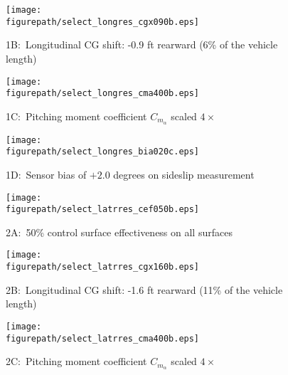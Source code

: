 \documentclass[]{../sty/aiaa-tc}
\newcommand{\figurepath}{../fig}
\begin{document}
  \begin{figure}[H]
    \begin{center}
      \texttt{[image: \\figurepath/select\_longres\_cgx090b.eps]}
      \caption{1B:\ Longitudinal CG shift: -0.9 ft rearward (6\% of the vehicle length)}
    \end{center}
  \end{figure}

  \begin{figure}[H]
    \begin{center}
      \texttt{[image: \\figurepath/select\_longres\_cma400b.eps]}
      \caption{1C:\ Pitching moment coefficient $C_{m_{\alpha}}$ scaled $4\times$}
    \end{center}
  \end{figure}

  \begin{figure}[H]
    \begin{center}
      \texttt{[image: \\figurepath/select\_longres\_bia020c.eps]}
      \caption{1D:\ Sensor bias of $+2.0$ degrees on sideslip measurement}
      \vspace{-0.2in}
    \end{center}
  \end{figure}

  \begin{figure}[H]
    \begin{center}
      \texttt{[image: \\figurepath/select\_latrres\_cef050b.eps]}
      \caption{2A:\ 50\% control surface effectiveness on all surfaces}
    \end{center}
  \end{figure}

  \begin{figure}[H]
    \begin{center}
      \texttt{[image: \\figurepath/select\_latrres\_cgx160b.eps]}
      \caption{2B:\ Longitudinal CG shift: -1.6 ft rearward (11\% of the vehicle length)}
      \vspace{-0.2in}
    \end{center}
  \end{figure}

  \begin{figure}[H]
    \begin{center}
      \texttt{[image: \\figurepath/select\_latrres\_cma400b.eps]}
      \caption{2C:\ Pitching moment coefficient $C_{m_{\alpha}}$ scaled $4\times$}
      \vspace{-0.2in}
    \end{center}
  \end{figure}
\end{document}
